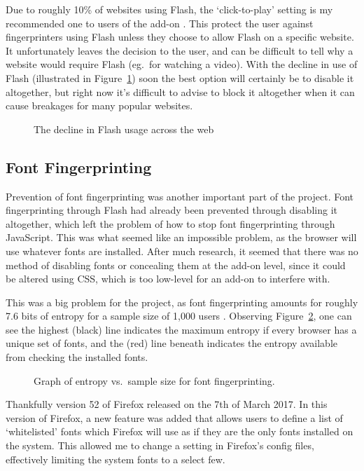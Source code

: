 Due to roughly 10\% of websites using Flash, the `click-to-play' setting is my recommended one to users of the add-on \citep{flash-usage}.
This protect the user against fingerprinters using Flash unless they choose to allow Flash on a specific website.
It unfortunately leaves the decision to the user, and can be difficult to tell why a website would require Flash (eg.\ for watching a video).
With the decline in use of Flash (illustrated in Figure~\ref{fig:flash-usage}) soon the best option will certainly be to disable it altogether, but right now it's difficult to advise to block it altogether when it can cause breakages for many popular websites.

\begin{figure}[h!]
\caption{The decline in Flash usage across the web}
\centering
\label{fig:flash-usage}
\end{figure}

\subsection{Font Fingerprinting}

Prevention of font fingerprinting was another important part of the project.
Font fingerprinting through Flash had already been prevented through disabling it altogether, which left the problem of how to stop font fingerprinting through JavaScript.
This was what seemed like an impossible problem, as the browser will use whatever fonts are installed.
After much research, it seemed that there was no method of disabling fonts or concealing them at the add-on level, since it could be altered using CSS, which is too low-level for an add-on to interfere with.

This was a big problem for the project, as font fingerprinting amounts for roughly 7.6 bits of entropy for a sample size of 1,000 users \citep{font-metrics}.
Observing Figure~\ref{fig:font-metrics}, one can see the highest (black) line indicates the maximum entropy if every browser has a unique set of fonts, and the (red) line beneath indicates the entropy available from checking the installed fonts.

\begin{figure}[h!]
\caption{Graph of entropy vs.\ sample size for font fingerprinting.}
\centering
\label{fig:font-metrics}
\end{figure}

Thankfully version 52 of Firefox released on the 7th of March 2017.
In this version of Firefox, a new feature was added that allows users to define a list of `whitelisted' fonts which Firefox will use as if they are the only fonts installed on the system.
This allowed me to change a setting in Firefox's config files, effectively limiting the system fonts to a select few.

